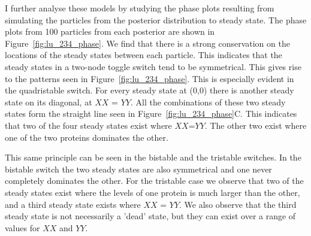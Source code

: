 I further analyse these models by studying the phase plots resulting from simulating the particles from the posterior distribution to steady state. The phase plots from 100 particles from each posterior are shown in Figure~\ref{fig:lu_234_phase}. We find that there is a strong conservation on the locations of the steady states between each particle. This indicates that the steady states in a two-node toggle switch tend to be symmetrical. This gives rise to the patterns seen in Figure~\ref{fig:lu_234_phase}. This is especially evident in the quadristable switch.  For every steady state at (0,0) there is another steady state on its diagonal, at $XX$ = $YY$. All the combinations of these two steady states form the straight line seen in Figure~\ref{fig:lu_234_phase}C. This indicates that two of the four steady states exist where $XX$=$YY$. The other two exist where one of the two proteins dominates the other. 

This same principle can be seen in the bistable and the tristable switches. In the bistable switch the two steady states are also symmetrical and one never completely dominates the other. For the tristable case we observe that two of the steady states exist where the levels of one protein is much larger than the other, and a third steady state exists where $XX$ = $YY$. We also observe that the third steady state is not necessarily a 'dead' state, but they can exist over a range of values for $XX$ and $YY$.


